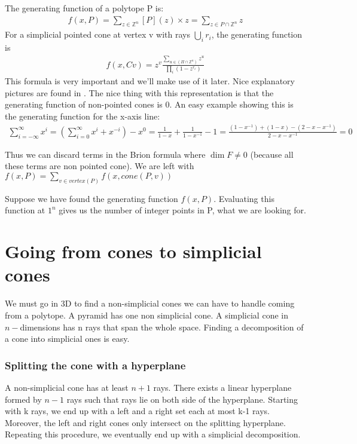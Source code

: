 \documentclass[14pt]{article}
\newcommand{\Z}{\mathbb{Z}}
\begin{document}
The generating function of a polytope P is:
\begin{align*}
f(x,P) = \sum_{z \in \Z^n} [P](z) \times z = \sum_{z \in P \cap \Z^n} z
\end{align*}
For a simplicial pointed cone at vertex v with rays $\bigcup_i{r_i}$, the generating function is 
\begin{align*}f(x,Cv) = z^v \frac{\sum_{u \in (\Pi \cap \Z^n)} z^u}{\prod_i (1 - z^{r_i})}\end{align*}
  This formula is very important and we'll make use of it later.
Nice explanatory pictures are found in \cite{Yoshida}.
The nice thing with this representation is that the generating function of non-pointed cones is 0. An easy example showing this is the generating function for the x-axis line:
\begin{align*}\sum_{i=-\infty}^{\infty} x^i = \left(\sum_{i=0}^{\infty} x^i + x^{-i}\right) - x^0 = \frac{1}{1-x} + \frac{1}{1-x^{-1}} - 1 = \frac{(1-x^{-1}) + (1-x) - (2-x-x^{-1})}{2-x-x^{-1}} = 0\end{align*}

Thus we can discard terms in the Brion formula where $\dim F \neq 0$ (because all these terms are non pointed cone).
We are left with
$f(x,P) = \sum_{v \in vertex(P)} f(x, cone(P,v))$

Suppose we have found the generating function $f(x,P)$. Evaluating this function at $1^n$ gives us the number of integer points in P, what we are looking for.


\section*{Going from cones to simplicial cones}

We must go in 3D to find a non-simplicial cones we can have to handle coming from a polytope. A pyramid has one non simplicial cone. A simplicial cone in $n-$dimensions has n rays that span the whole space.
Finding a decomposition of a cone into simplicial ones is easy.

\subsubsection*{Splitting the cone with a hyperplane}
A non-simplicial cone has at least $n+1$ rays.
There exists a linear hyperplane formed by $n-1$ rays such that rays lie on both side of the hyperplane.
Starting with k rays, we end up with a left and a right set each at most k-1 rays. Moreover, the left and right cones only intersect on the splitting hyperplane.
Repeating this procedure, we eventually end up with a simplicial decomposition.
\end{document}
